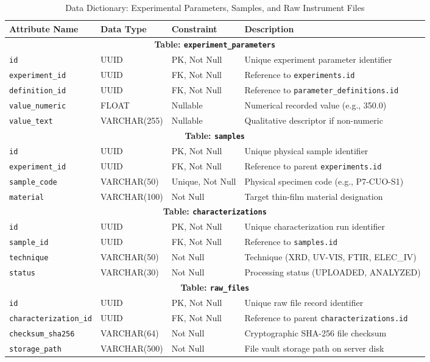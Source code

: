 \documentclass[12pt,a4paper,oneside]{report}
\begin{document}
{{{\begin{table}[!htbp]
\centering
\footnotesize
\setlength{\tabcolsep}{4pt}
\renewcommand{\arraystretch}{1.2}
\caption{Data Dictionary: Experimental Parameters, Samples, and Raw Instrument Files}
\label{tab:dd_samples}
\begin{tabular}{|p{3.7cm}|p{2.7cm}|p{2.5cm}|p{5.4cm}|}
\hline
\textbf{Attribute Name} & \textbf{Data Type} & \textbf{Constraint} & \textbf{Description} \\
\hline
\hline
\multicolumn{4}{|c|}{\textbf{Table: \texttt{experiment\_parameters}}} \\
\hline
\texttt{id} & UUID & PK, Not Null & Unique experiment parameter identifier \\
\texttt{experiment\_id} & UUID & FK, Not Null & Reference to \texttt{experiments.id} \\
\texttt{definition\_id} & UUID & FK, Not Null & Reference to \texttt{parameter\_definitions.id} \\
\texttt{value\_numeric} & FLOAT & Nullable & Numerical recorded value (e.g., 350.0) \\
\texttt{value\_text} & VARCHAR(255) & Nullable & Qualitative descriptor if non-numeric \\
\hline
\hline
\multicolumn{4}{|c|}{\textbf{Table: \texttt{samples}}} \\
\hline
\texttt{id} & UUID & PK, Not Null & Unique physical sample identifier \\
\texttt{experiment\_id} & UUID & FK, Not Null & Reference to parent \texttt{experiments.id} \\
\texttt{sample\_code} & VARCHAR(50) & Unique, Not Null & Physical specimen code (e.g., P7-CUO-S1) \\
\texttt{material} & VARCHAR(100) & Not Null & Target thin-film material designation \\
\hline
\hline
\multicolumn{4}{|c|}{\textbf{Table: \texttt{characterizations}}} \\
\hline
\texttt{id} & UUID & PK, Not Null & Unique characterization run identifier \\
\texttt{sample\_id} & UUID & FK, Not Null & Reference to \texttt{samples.id} \\
\texttt{technique} & VARCHAR(50) & Not Null & Technique (XRD, UV-VIS, FTIR, ELEC\_IV) \\
\texttt{status} & VARCHAR(30) & Not Null & Processing status (UPLOADED, ANALYZED) \\
\hline
\hline
\multicolumn{4}{|c|}{\textbf{Table: \texttt{raw\_files}}} \\
\hline
\texttt{id} & UUID & PK, Not Null & Unique raw file record identifier \\
\texttt{characterization\_id} & UUID & FK, Not Null & Reference to parent \texttt{characterizations.id} \\
\texttt{checksum\_sha256} & VARCHAR(64) & Not Null & Cryptographic SHA-256 file checksum \\
\texttt{storage\_path} & VARCHAR(500) & Not Null & File vault storage path on server disk \\
\hline
\end{tabular}
\end{table}

}}}
\end{document}
